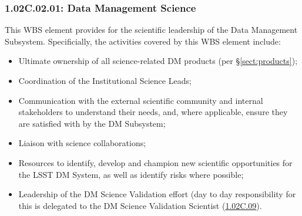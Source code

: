 \subsubsection*{1.02C.02.01: Data Management Science}

This WBS element provides for the scientific leadership of the Data Management
Subsystem. Specificially, the activities covered by this WBS element include:

\begin{itemize}

  \item{Ultimate ownership of all science-related DM products (per \S\ref{sect:products});}

  \item{Coordination of the Institutional Science Leads;}

  \item{Communication with the external scientific community and internal
  stakeholders to understand their needs, and, where applicable, ensure they
  are satisfied with by the DM Subsystem;}

  \item{Liaison with science collaborations;}

  \item{Resources to identify, develop and champion new scientific
  opportunities for the LSST DM System, as well as identify risks where
  possible;}

  \item{Leadership of the DM Science Validation effort (day to day
  responsibility for this is delegated to the DM Science Validation Scientist
  (\hyperref[wbs:1.02C.09]{1.02C.09}).}

\end{itemize}
